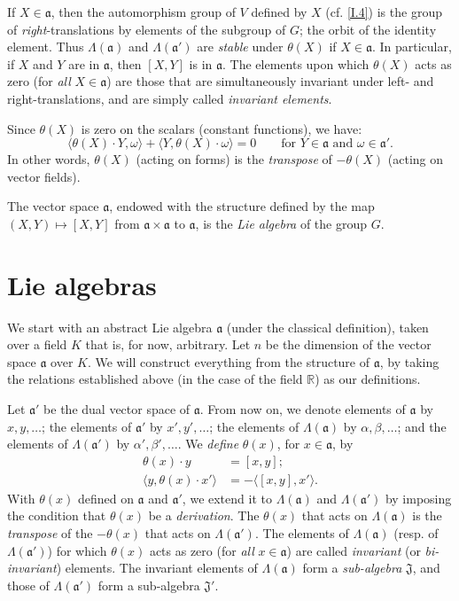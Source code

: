 \documentclass{article}
\newcommand{\RR}{\mathbb{R}}
\newcommand{\fk}{\mathfrak}
\newcommand{\oldpage}[1]{\marginpar{\footnotesize$\Big\vert$ \textit{p.~#1}}}
\begin{document}
If $X\in\fk{a}$, then the automorphism group of $V$ defined by $X$ (cf. \cref{I.4}) is the group of \emph{right}-translations by elements of the subgroup of $G$;
the orbit of the identity element.
Thus $\Lambda(\fk{a})$ and $\Lambda(\fk{a}')$ are \emph{stable} under $\theta(X)$ if $X\in\fk{a}$.
In particular, if $X$ and $Y$ are in $\fk{a}$, then $[X,Y]$ is in $\fk{a}$.
The elements upon which $\theta(X)$ acts as zero (for \emph{all} $X\in\fk{a}$) are those that are simultaneously invariant under left- and right-translations, and are simply called \emph{invariant elements}.

Since $\theta(X)$ is zero on the scalars (constant functions), we have:
\[
\label{equation-I.3}
  \langle \theta(X)\cdot Y,\omega \rangle + \langle Y,\theta(X)\cdot\omega \rangle
  = 0
  \qquad\mbox{for $Y\in\fk{a}$ and $\omega\in\fk{a}'$.}
\tag{3}
\]
In other words, $\theta(X)$ (acting on forms) is the \emph{transpose} of $-\theta(X)$ (acting on vector fields).

The vector space $\fk{a}$, endowed with the structure defined by the map $(X,Y)\mapsto[X,Y]$ from $\fk{a}\times\fk{a}$ to $\fk{a}$, is the \emph{Lie algebra} of the group $G$.


\section{Lie algebras}
\label{I.6}

We start with an abstract Lie algebra $\fk{a}$ (under the classical definition), taken over a field $K$ that is, for now, arbitrary.
Let $n$ be the dimension of the vector space $\fk{a}$ over $K$.
We will construct everything from the structure of $\fk{a}$, by taking the relations established above (in the case of the field $\RR$) as our definitions.

\oldpage{11}
Let $\fk{a}'$ be the dual vector space of $\fk{a}$.
From now on, we denote elements of $\fk{a}$ by $x,y,\ldots$;
the elements of $\fk{a}'$ by $x',y',\ldots$;
the elements of $\Lambda(\fk{a})$ by $\alpha,\beta,\ldots$;
and the elements of $\Lambda(\fk{a}')$ by $\alpha',\beta',\ldots$.
We \emph{define} $\theta(x)$, for $x\in\fk{a}$, by
\[
  \begin{aligned}
    \theta(x)\cdot y
    &= [x,y];
  \\\langle y,\theta(x)\cdot x'\rangle
    &= -\langle[x,y],x'\rangle.
  \end{aligned}
\]
With $\theta(x)$ defined on $\fk{a}$ and $\fk{a}'$, we extend it to $\Lambda(\fk{a})$ and $\Lambda(\fk{a}')$ by imposing the condition that $\theta(x)$ be a \emph{derivation}.
The $\theta(x)$ that acts on $\Lambda(\fk{a})$ is the \emph{transpose} of the $-\theta(x)$ that acts on $\Lambda(\fk{a}')$.
The elements of $\Lambda(\fk{a})$ (resp. of $\Lambda(\fk{a}')$) for which $\theta(x)$ acts as zero (for \emph{all} $x\in\fk{a}$) are called \emph{invariant} (or \emph{bi-invariant}) elements.
The invariant elements of $\Lambda(\fk{a})$ form a \emph{sub-algebra} $\fk{J}$, and those of $\Lambda(\fk{a}')$ form a sub-algebra $\fk{J}'$.
\end{document}
